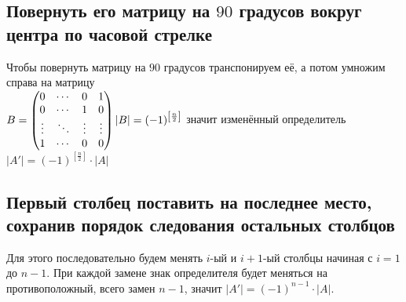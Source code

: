 \subsection{Повернуть его матрицу на $ 90 $ градусов вокруг центра по часовой стрелке}
Чтобы повернуть матрицу на $ 90 $ градусов транспонируем её, а потом умножим справа на матрицу
\\[1em]
$
	B =
	\begin{pmatrix}
		0 & \cdots & 0 & 1 \\
		0 & \cdots & 1 & 0 \\
		\vdots & \ddots & \vdots & \vdots \\
		1 & \cdots & 0 & 0 \\
	\end{pmatrix}
\\
	|B| = (-1)^{\left[\frac{n}{2}\right]}
$ значит изменённый определитель $ |A'| = (-1)^{\left[\frac{n}{2}\right]} \cdot |A| $
\subsection{Первый столбец поставить на последнее место, сохранив порядок следования остальных столбцов}
Для этого последовательно будем менять $ i $-ый и $ i+1 $-ый столбцы начиная с $ i = 1 $ до $ n - 1 $.
При каждой замене знак определителя будет меняться на противоположный, всего замен $ n - 1 $, значит $ |A'| = (-1)^{n-1} \cdot |A| $.
